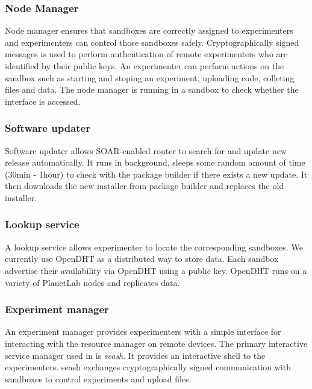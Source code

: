 \subsubsection{Node Manager}
\label{sec.nodemanager}
Node manager\cite{nodemanager} ensures that sandboxes are correctly assigned to experimenters and experimenters can control those sandboxes safely. Cryptographically signed messages is used to perform authentication of remote experimenters who are identified by their public keys. An experimenter can perform actions on the sandbox such as starting and stoping an experiment, uploading code, colleting files and data. The node manager is running in a sandbox to check whether the interface is accessed.

\subsubsection{Software updater}
\label{sec.softwareupdater}
Software updater allows SOAR-enabled router to search for and update new release automatically. It runs in background, sleeps some random amount of time (30min - 1hour) to check with the package builder if there exists a new update. It then downloads the new installer from package builder and replaces the old installer.

\subsubsection{Lookup service}
\label{sec.lookupservice}
A lookup service allows experimenter to locate the corresponding sandboxes. We currently use OpenDHT\cite{rhea2005opendht} as a distributed way to store data. Each sandbox advertise their availability via OpenDHT using a public key. OpenDHT runs on a variety of PlanetLab nodes and replicates data.

\subsubsection{Experiment manager}
\label{sec.seash}
An experiment manager provides experimenters with a simple interface for interacting with the resource manager on remote devices. The primary interactive service manager used in \sysname is \textit{seash}\cite{seash}. It provides an interactive shell to the experimenters. seash exchanges cryptographically signed communication with sandboxes to control experiments and upload files.

